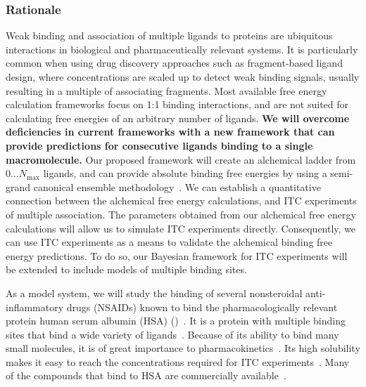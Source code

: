\documentclass[10pt,final]{article}
\begin{document}
\subsubsection*{Rationale}
Weak binding and association of multiple ligands to proteins are ubiquitous interactions in biological and pharmaceutically relevant systems.
%
It is particularly common when using drug discovery approaches such as fragment-based ligand design, where concentrations are scaled up to detect weak binding signals, usually resulting in a multiple of associating fragments.
%
Most available free energy calculation frameworks focus on 1:1 binding interactions, and are not suited for calculating free energies of an arbitrary number of ligands.
%
\textbf{We will overcome deficiencies in current frameworks with a new framework that can provide predictions for consecutive ligands binding to a single macromolecule.}
%
Our proposed framework will create an alchemical ladder from 0$\dots N_\mathrm{max}$ ligands, and can provide absolute binding free energies by using a semi-grand canonical ensemble methodology~\autocite{Kofke1988a,Kofke1999a,Lynch2000a}.
%
We can establish a quantitative connection between the alchemical free energy calculations, and ITC experiments of multiple association.
%
The parameters obtained from our alchemical free energy calculations will allow us to simulate ITC experiments directly.
%
Consequently, we can use ITC experiments as a means to validate the alchemical binding free energy predictions.
%
To do so, our Bayesian framework for ITC experiments will be extended to include models of multiple binding sites.
%

As a model system, we will study the binding of several nonsteroidal anti-inflammatory drugs (NSAIDs) known to bind the pharmacologically relevant protein human serum albumin (HSA) ()~\autocite{Zsila2011a}.
%
It is a protein with multiple binding sites that bind a wide variety of ligands~\autocite{He1992a,Kragh-Hansen2002a,Sulkowska2002a}.
%
Because of its ability to bind many small molecules, it is of great importance to pharmacokinetics~\autocite{Metcalfe2010a}.
%
Its high solubility makes it easy to reach the concentrations required for ITC experiments~\autocite{Jr.1995a}. 
%
Many of the compounds that bind to HSA are commercially available~\autocite{Zsila2011a}.
\end{document}
